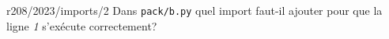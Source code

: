 \begin{question}{r208/2023/imports/2}
  Dans \texttt{pack/b.py} quel import faut-il ajouter pour que la
  ligne {\em 1} s'exécute correctement?
  \begin{reponses}
  \end{reponses}
\end{question}
